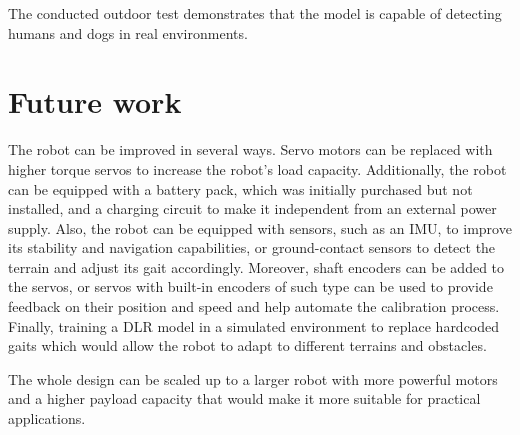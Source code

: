 \documentclass[a4paper,12pt]{report}
\begin{document}
The conducted outdoor test demonstrates that the model is capable of detecting humans and dogs in
real environments.

\chapter{Future work}
\label{chap:future-work}
The robot can be improved in several ways. Servo motors can be replaced with higher torque servos
to increase the robot's load capacity. Additionally, the robot can be equipped with a battery pack,
which was initially purchased but not installed, and a charging circuit to make it independent from
an external power supply. Also, the robot can be equipped with sensors, such as an IMU, to improve
its stability and navigation capabilities, or ground-contact sensors to detect the terrain and
adjust its gait accordingly. Moreover, shaft encoders can be added to the servos, or servos with
built-in encoders of such type can be used to provide feedback on their position and speed and help
automate the calibration process. Finally, training a DLR model in a simulated environment to
replace hardcoded gaits which would allow the robot to adapt to different terrains and obstacles.

The whole design can be scaled up to a larger robot with more powerful motors and a higher payload
capacity that would make it more suitable for practical applications.
\end{document}
